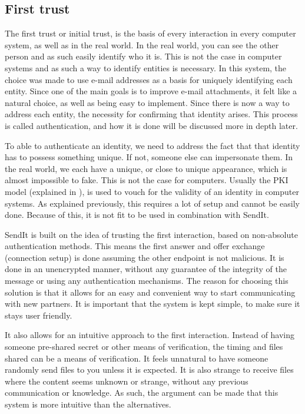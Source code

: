 %
	\subsection{First trust}
		The first trust or initial trust, is the basis of every interaction in every computer system, as well as in the real world. In the real world, you can see the other person and as such easily identify who it is. This is not the case in computer systems and as such a way to identify entities is necessary. In this system, the choice was made to use e-mail addresses as a basis for uniquely identifying each entity. Since one of the main goals is to improve e-mail attachments, it felt like a natural choice, as well as being easy to implement. Since there is now a way to address each entity, the necessity for confirming that identity arises. This process is called authentication, and how it is done will be discussed more in depth later.

		To able to authenticate an identity, we need to address the fact that that identity has to possess something unique. If not, someone else can impersonate them. In the real world, we each have a unique, or close to unique appearance, which is almost impossible to fake. This is not the case for computers. Usually the PKI model (explained in ), is used to vouch for the validity of an identity in computer systems. As explained previously, this requires a lot of setup and cannot be easily done. Because of this, it is not fit to be used in combination with SendIt. 

		SendIt is built on the idea of trusting the first interaction, based on non-absolute authentication methods. This means the first answer and offer exchange (connection setup) is done assuming the other endpoint is not malicious. It is done in an unencrypted manner, without any guarantee of the integrity of the message or using any authentication mechanisms. The reason for choosing this solution is that it allows for an easy and convenient way to start communicating with new partners. It is important that the system is kept simple, to make sure it stays user friendly.

		It also allows for an intuitive approach to the first interaction. Instead of having someone pre-shared secret or other means of verification, the timing and files shared can be a means of verification. It feels unnatural to have someone randomly send files to you unless it is expected. It is also strange to receive files where the content seems unknown or strange, without any previous communication or knowledge. As such, the argument can be made that this system is more intuitive than the alternatives.

